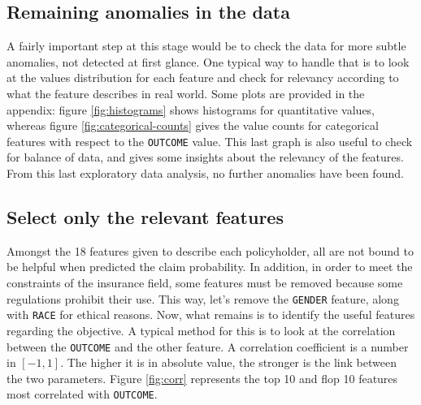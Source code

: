 \documentclass[a4paper,11pt, titlepage]{article}
\begin{document}
\subsection{Remaining anomalies in the data}

A fairly important step at this stage would be to check the data for more subtle anomalies, not detected at first glance. One typical way to handle that is to look at the values distribution for each feature and check for relevancy according to what the feature describes in real world. Some plots are provided in the appendix: figure \ref{fig:histograms} shows histograms for quantitative values, whereas figure \ref{fig:categorical-counts} gives the value counts for categorical features with respect to the {\tt OUTCOME} value. This last graph is also useful to check for balance of data, and gives some insights about the relevancy of the features. From this last exploratory data analysis, no further anomalies have been found.\newline

\subsection{Select only the relevant features}

Amongst the 18 features given to describe each policyholder, all are not bound to be helpful when predicted the claim probability. In addition, in order to meet the constraints of the insurance field, some features must be removed because some regulations prohibit their use. This way, let's remove the {\tt GENDER} feature, along with {\tt RACE} for ethical reasons. Now, what remains is to identify the useful features regarding the objective. A typical method for this is to look at the correlation between the {\tt OUTCOME} and the other feature. A correlation coefficient is a number in $[-1,1]$. The higher it is in absolute value, the stronger is the link between the two parameters. Figure \ref{fig:corr} represents the top 10 and flop 10 features most correlated with {\tt OUTCOME}.
\end{document}
